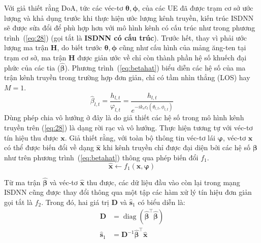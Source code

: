 Với giả thiết rằng DoA, tức các véc-tơ $\boldsymbol\theta, \boldsymbol\phi$, của các UE đã được trạm cơ sở ước lượng và khả dụng trước khi thực hiện ước lượng kênh truyền, kiến trúc ISDNN sẽ được sửa đổi để phù hợp hơn với mô hình kênh có cấu trúc như trong phương trình~(\ref{eq:28}) (gọi tắt là \textbf{ISDNN có cấu trúc}). Trước hết, thay vì phải ước lượng ma trận $\mathbf{H}$, do biết trước $\boldsymbol\theta, \boldsymbol\phi$ cũng như cấu hình của mảng ăng-ten tại trạm cơ sở, ma trận $\mathbf{H}$ được giản ước về chỉ còn thành phần hệ số khuếch đại phức của các tia ($\hat{\boldsymbol{\beta}}$). Phương trình~(\ref{eq:betahat}) biểu diễn các hệ số của ma trận kênh truyền trong trường hợp đơn giản, chỉ có tầm nhìn thẳng (LOS) hay $M = 1$.
\begin{equation}
\label{eq:betahat}
    \hat{\beta}_{l, t} = \frac{h_{l, t}} {\varphi_{l,t}}= \frac{h_{l, t}}{e^{-i k_s c_l (\theta_{l,t}, \phi_{l, t})}}
\end{equation}
Dùng phép chia vô hướng ở đây là do giả thiết các hệ số trong mô hình kênh truyền trên (\ref{eq:28}) là dạng rời rạc và vô hướng. Thực hiện tương tự với véc-tơ tín hiệu thu được $\mathbf{x}$. Giả thiết rằng, với toàn bộ thông tin véc-tơ lái $\boldsymbol{\varphi}$, véc-tơ $\mathbf{x}$ có thể được biến đổi về dạng $\hat{\mathbf{x}}$ khi kênh truyền chỉ được đại diện bởi các hệ số $\boldsymbol{\beta}$ như trên phương trình~(\ref{eq:betahat}) thông qua phép biến đổi $f_1$.
\begin{equation}
    \hat{\mathbf{x}} \longleftarrow f_1(\mathbf{x}, \boldsymbol{\varphi})
\end{equation}

Từ ma trận $\hat{\boldsymbol{\beta}}$ và véc-tơ $\hat{\mathbf{x}}$ thu được, các dữ liệu đầu vào còn lại trong mạng ISDNN cũng được thay đổi thông qua một tập các hàm xử lý tín hiệu đơn giản gọi tắt là $f_2$. Trong đó, hai giá trị $\mathbf{D}$ và $\hat{\mathbf{s}}_{1}$ có biểu diễn là:
\begin{equation}
    \begin{aligned}
        \mathbf{D} &= \operatorname{diag}(\hat{\boldsymbol{\beta}}^\top \hat{\boldsymbol{\beta}}) \\
        \hat{\mathbf{s}}_{1} &= \mathbf{D}^{-1} \hat{\boldsymbol{\beta}}^\top \hat{\mathbf{x}}
    \end{aligned}
\end{equation}

